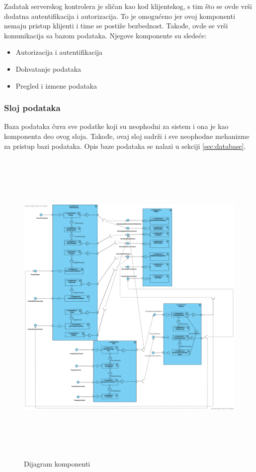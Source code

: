 Zadatak serverskog kontrolera je sličan kao kod klijentskog, s tim što se ovde vrši dodatna autentifikacija 
i autorizacija. To je omogućeno jer ovoj komponenti nemaju pristup klijenti i time se postiže bezbednost.
Takođe, ovde se vrši komunikacija sa bazom podataka.
Njegove komponente su sledeće:

\begin{itemize}
    \item Autorizacija i autentifikacija
    \item Dohvatanje podataka
    \item Pregled i izmene podataka 
\end{itemize}

\subsubsection {Sloj podataka}

Baza podataka čuva sve podatke koji su neophodni za sistem i ona je kao komponenta deo ovog sloja.
Takođe, ovaj sloj sadrži i sve neophodne mehanizme za pristup bazi podataka.
Opis baze podataka se nalazi u sekciji \ref{sec:database}.


\begin{figure}[H]
  \begin{center}
      \includegraphics[width=\textwidth, height=600px]{Diagrams/dijagram_komponenti.png}
  \end{center}
  \caption {Dijagram komponenti}
  \label{dijagram_komponenti}

\end{figure}



